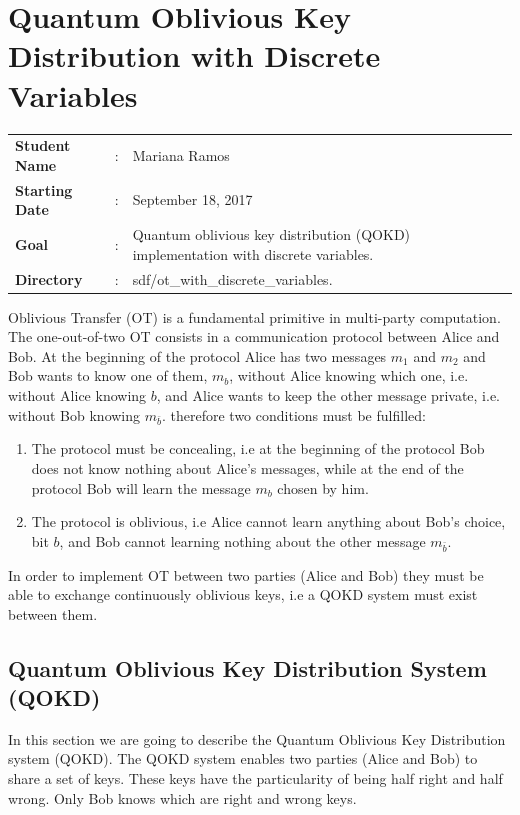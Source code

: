 \clearpage
\section{Quantum Oblivious Key Distribution with Discrete Variables}

\begin{tcolorbox}	
\begin{tabular}{p{2.75cm} p{0.2cm} p{10.5cm}} 	
\textbf{Student Name}  &:& Mariana Ramos\\
\textbf{Starting Date} &:& September 18, 2017\\
\textbf{Goal}          &:& Quantum oblivious key distribution (QOKD) implementation with discrete variables.\\
\textbf{Directory}     &:& sdf/ot\_with\_discrete\_variables.
\end{tabular}
\end{tcolorbox}

Oblivious Transfer (OT) is a fundamental primitive in multi-party computation. The one-out-of-two OT consists in a communication protocol between Alice and Bob. At the beginning of the protocol Alice has two messages $m_1$ and $m_2$ and Bob wants to know one of them, $m_b$, without Alice knowing which one, i.e. without Alice knowing $b$, and Alice wants to keep the other message private, i.e. without Bob knowing $m_{\bar{b}}$. therefore two conditions must be fulfilled:
\begin{enumerate}
	\item{The protocol must be concealing, i.e at the beginning of the protocol Bob does not know nothing about Alice's messages, while at the end of the protocol Bob will learn the message $m_{b}$ chosen by him.}
	\item{The protocol is oblivious, i.e Alice cannot learn anything about Bob's choice, bit $b$, and Bob cannot learning nothing about the other message $m_{\bar{b}}$.}
\end {enumerate}

In order to implement OT between two parties (Alice and Bob) they must be able to exchange continuously oblivious keys, i.e a QOKD system must exist between them.

\subsection{Quantum Oblivious Key Distribution System (QOKD)}

In this section we are going to describe the Quantum Oblivious Key Distribution system (QOKD).
The QOKD system enables two parties (Alice and Bob) to share a set of keys. These keys have the particularity of being half right and half wrong. Only Bob knows which are right and wrong keys.

